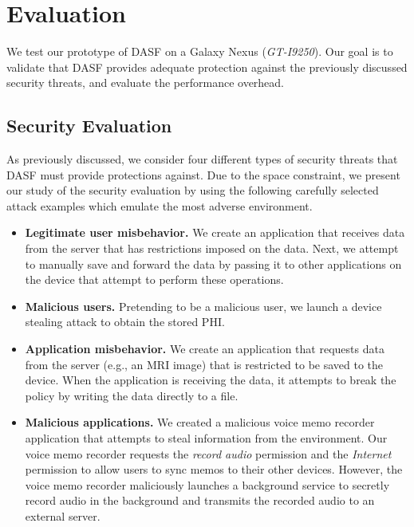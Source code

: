 \section{Evaluation}

We test our prototype of DASF on a Galaxy Nexus (\textit{GT-I9250}).
Our goal is to validate that DASF provides adequate protection against the
previously discussed security threats, and evaluate the performance overhead.

\subsection{Security Evaluation}

As previously discussed, we consider four different
types of security threats that DASF must provide protections
against. Due to the space constraint, we present our study of the
security evaluation by using the following carefully selected
attack examples which emulate the most adverse environment. 


\begin{itemize}
\item \textbf{Legitimate user misbehavior.}  We create an application
that receives data from the server that has restrictions imposed on
  the data.  Next, we attempt to manually save and forward the data by
  passing it to other applications on the device that attempt to
  perform these operations. 
\item \textbf{Malicious users.} Pretending to be a malicious user, we
  launch a device stealing attack to obtain the stored PHI.
\item \textbf{Application misbehavior.}  We create an application that requests
  data from the server (e.g., an MRI image) that is restricted to be saved
  to the device.  When the application is receiving the data, it attempts
  to break the policy by writing the data directly to a file.
\item \textbf{Malicious applications.}  We created a malicious voice memo recorder
  application that attempts to steal information from the environment. Our
  voice memo recorder requests the \textit{record audio} permission
  and the \textit{Internet} permission to allow users to sync memos to their
  other devices.  However, the voice memo recorder maliciously launches
  a background service to secretly record audio in the background and
  transmits the recorded audio to an external server.
\end{itemize}

